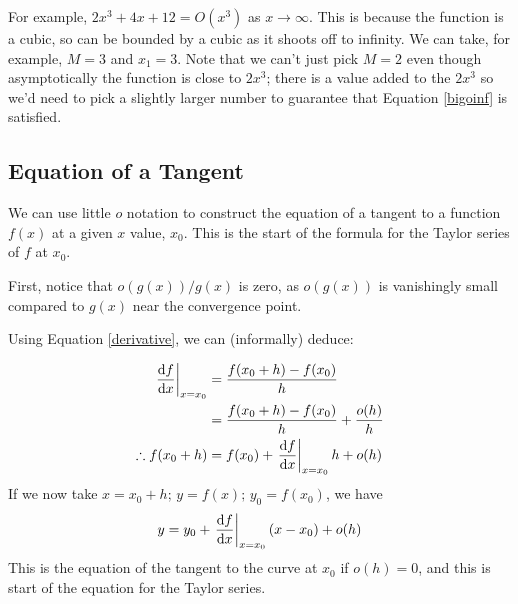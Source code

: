 For example, $2x^3 + 4x + 12 = O(x^3)$ as $x \to \infty$. This is because the function is a cubic, so can be bounded by a cubic as it shoots off to infinity. We can take, for example, $M = 3$ and $x_1 = 3$. Note that we can't just pick $M=2$ even though asymptotically the function is close to $2x^3$; there is a value added to the $2x^3$ so we'd need to pick a slightly larger number to guarantee that Equation \eqref{bigoinf} is satisfied.

\subsection{Equation of a Tangent}
We can use little $o$ notation to construct the equation of a tangent to a function $f(x)$ at a given $x$ value, $x_0$. This is the start of the formula for the Taylor series of $f$ at $x_0$.

First, notice that $o(g(x))/g(x)$ is zero, as $o(g(x))$ is vanishingly small compared to $g(x)$ near the convergence point.

Using Equation \eqref{derivative}, we can (informally) deduce:

\begin{align*}
	\eval{\frac{\dd{f}}{\dd{x}}}_{x=x_0} & = \frac{f(x_0 + h) - f(x_0)}{h}                          \\
	                                     & = \frac{f(x_0 + h) - f(x_0)}{h} + \frac{o(h)}{h}         \\
	\therefore f(x_0 + h)                & = f(x_0) + \eval{\frac{\dd{f}}{\dd{x}}}_{x=x_0} h + o(h)
\end{align*}
If we now take $x=x_0+h;\,y=f(x);\,y_0=f(x_0)$, we have
\[ y = y_0 + \eval{\frac{\dd{f}}{\dd{x}}}_{x=x_0}(x - x_0) + o(h) \]
This is the equation of the tangent to the curve at $x_0$ if $o(h)=0$, and this is start of the equation for the Taylor series.
